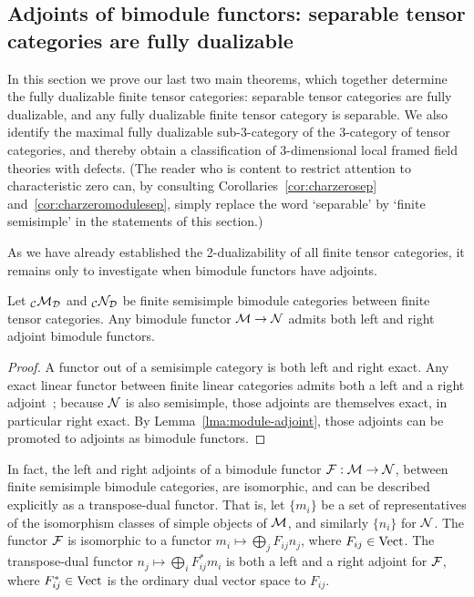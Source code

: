 \documentclass{amsart}
\begin{document}
\subsection{Adjoints of bimodule functors: separable tensor categories are fully dualizable} \label{sec:separableisfd}


In this section we prove our last two main theorems, which together determine the fully dualizable finite tensor categories: separable tensor categories are fully dualizable, and any fully dualizable finite tensor category is separable.  We also identify the maximal fully dualizable sub-3-category of the 3-category of tensor categories, and thereby obtain a classification of 3-dimensional local framed field theories with defects.  (The reader who is content to restrict attention to characteristic zero can, by consulting Corollaries~\ref{cor:charzerosep} and~\ref{cor:charzeromodulesep}, simply replace the word `separable' by `finite semisimple' in the statements of this section.)

As we have already established the 2-dualizability of all finite tensor categories, it remains only to investigate when bimodule functors have adjoints.
\begin{proposition} \label{prop:bimodfunctadjoints}
Let ${}_\mathcal C \mathcal M_\mathcal D$ and ${}_\mathcal C \mathcal N_\mathcal D$ be finite semisimple bimodule categories between finite tensor categories.  Any bimodule functor $\mathcal M \rightarrow \mathcal N$ admits both left and right adjoint bimodule functors.
\end{proposition}
\begin{proof}
A functor out of a semisimple category is both left and right exact.  Any exact linear functor between finite linear categories admits both a left and a right adjoint~\cite{BTP}; because $\mathcal N$ is also semisimple, those adjoints are themselves exact, in particular right exact.  By Lemma~\ref{lma:module-adjoint}, those adjoints can be promoted to adjoints as bimodule functors.
\end{proof}

\begin{remark}
In fact, the left and right adjoints of a bimodule functor $\mathcal F: \mathcal M \rightarrow \mathcal N$, between finite semisimple bimodule categories, are isomorphic, and can be described explicitly as a transpose-dual functor.  That is, let $\{m_i\}$ be a set of representatives of the isomorphism classes of simple objects of $\mathcal M$, and similarly $\{n_i\}$ for $\mathcal N$.  The functor $\mathcal F$ is isomorphic to a functor $m_i \mapsto \bigoplus_j F_{ij} n_j$, where $F_{ij} \in \mathrm{Vect}$.  The transpose-dual functor $n_j \mapsto \bigoplus_i F_{ij}^* m_i$ is both a left and a right adjoint for $\mathcal F$, where $F_{ij}^* \in \mathrm{Vect}$ is the ordinary dual vector space to $F_{ij}$.
\end{remark}
\end{document}

